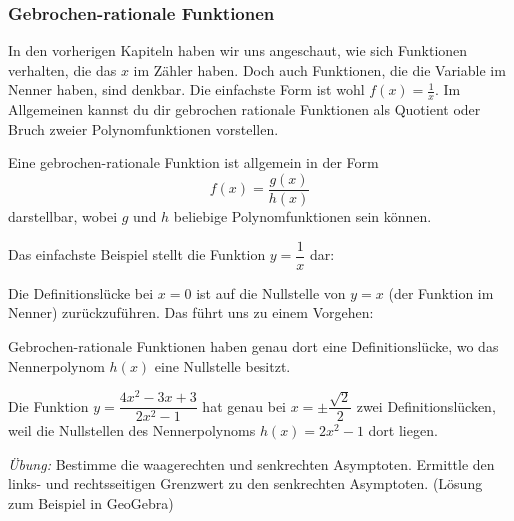 \documentclass[ngerman, 12pt]{nssheetxea}
\begin{document}
\subsubsection{Gebrochen-rationale Funktionen}
In den vorherigen Kapiteln haben wir uns angeschaut, wie sich Funktionen verhalten, die das $x$ im Zähler haben. Doch auch Funktionen, die die Variable im Nenner haben, sind denkbar. Die einfachste Form ist wohl $f(x)=\frac{1}{x}$. Im Allgemeinen kannst du dir gebrochen rationale Funktionen als Quotient oder Bruch zweier Polynomfunktionen vorstellen. 

\begin{definition}
Eine gebrochen-rationale Funktion ist allgemein in der Form
\[ f(x)=\dfrac{g(x)}{h(x)} \]
darstellbar, wobei $g$ und $h$ beliebige Polynomfunktionen sein können.
 
\end{definition}

\begin{example}
Das einfachste Beispiel stellt die Funktion $y=\dfrac{1}{x}$ dar:

\begin{center}
\end{center}

\end{example}

Die Definitionslücke bei $x=0$ ist auf die Nullstelle von $y=x$ (der Funktion im Nenner) zurückzuführen. Das führt uns zu einem Vorgehen:

\begin{theorem}

Gebrochen-rationale Funktionen haben genau dort eine Definitionslücke, wo das Nennerpolynom $h(x)$ eine Nullstelle besitzt. 
\end{theorem}

\begin{example}

Die Funktion $y=\dfrac{4x^2-3x+3}{2x^2-1}$ hat genau bei $x=\pm \dfrac{\sqrt{2}}{2}$ zwei Definitionslücken, weil die Nullstellen des Nennerpolynoms $h(x)=2x^2-1$ dort liegen. \par
\textit{Übung:} Bestimme die waagerechten und senkrechten Asymptoten. Ermittle den links- und rechtsseitigen Grenzwert zu den senkrechten Asymptoten. (Lösung zum Beispiel in GeoGebra)

\end{example}
\end{document}
